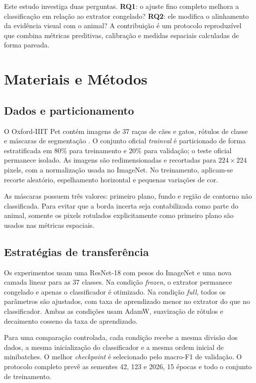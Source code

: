 \documentclass[conference]{IEEEtran}
\begin{document}
Este estudo investiga duas perguntas. \textbf{RQ1}: o ajuste fino completo melhora a classificação em relação ao extrator congelado? \textbf{RQ2}: ele modifica o alinhamento da evidência visual com o animal? A contribuição é um protocolo reproduzível que combina métricas preditivas, calibração e medidas espaciais calculadas de forma pareada.

\section{Materiais e Métodos}

\subsection{Dados e particionamento}

O Oxford-IIIT Pet contém imagens de 37 raças de cães e gatos, rótulos de classe e máscaras de segmentação \cite{parkhi2012cats}. O conjunto oficial \emph{trainval} é particionado de forma estratificada em 80\% para treinamento e 20\% para validação; o teste oficial permanece isolado. As imagens são redimensionadas e recortadas para $224\times224$ pixels, com a normalização usada no ImageNet. No treinamento, aplicam-se recorte aleatório, espelhamento horizontal e pequenas variações de cor.

As máscaras possuem três valores: primeiro plano, fundo e região de contorno não classificada. Para evitar que a borda incerta seja contabilizada como parte do animal, somente os pixels rotulados explicitamente como primeiro plano são usados nas métricas espaciais.

\subsection{Estratégias de transferência}

Os experimentos usam uma ResNet-18 com pesos do ImageNet e uma nova camada linear para as 37 classes. Na condição \emph{frozen}, o extrator permanece congelado e apenas o classificador é otimizado. Na condição \emph{full}, todos os parâmetros são ajustados, com taxa de aprendizado menor no extrator do que no classificador. Ambas as condições usam AdamW, suavização de rótulos e decaimento cosseno da taxa de aprendizado.

Para uma comparação controlada, cada condição recebe a mesma divisão dos dados, a mesma inicialização do classificador e a mesma ordem inicial de minibatches. O melhor \emph{checkpoint} é selecionado pelo macro-F1 de validação. O protocolo completo prevê as sementes 42, 123 e 2026, 15 épocas e todo o conjunto de treinamento.
\end{document}

